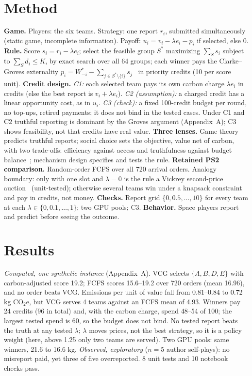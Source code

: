 \section{Method}\label{sec:method}
\textbf{Game.} Players: the six teams. Strategy: one report $r_i$, submitted simultaneously (static game, incomplete information). Payoff: $u_i=v_i-\lambda e_i-p_i$ if selected, else 0.
\textbf{Rule.} Score $s_i=r_i-\lambda e_i$; select the feasible group $S^*$ maximizing $\sum_{S}s_i$ subject to $\sum_{S}d_i\le K$, by exact search over all 64 groups; each winner pays the Clarke--Groves externality $p_i=W^*_{-i}-\sum_{j\in S^*\setminus\{i\}}s_j$~\cite{clarke1971,groves1973} in priority credits (10 per score unit).
\textbf{Credit design.} \emph{C1:} each selected team pays its own carbon charge \ensuremath{\lambda e_i} in credits (else the best report is \ensuremath{v_i+\lambda e_i}). \emph{C2 (assumption):} a charged credit has a linear opportunity cost, as in $u_i$. \emph{C3 (check):} a fixed 100-credit budget per round, no top-ups, retired payments; it does not bind in the tested cases. Under C1 and C2 truthful reporting is dominant by the Groves argument (Appendix~A); C3 shows feasibility, not that credits have real value.
\textbf{Three lenses.} Game theory predicts truthful reports; social choice sets the objective, value net of carbon, with two trade-offs: efficiency against access and truthfulness against budget balance~\cite{greenlaffont1977}; mechanism design specifies and tests the rule.
\textbf{Retained PS2 comparison.} Random-order FCFS over all 720 arrival orders. Analogy boundary: only with one slot and $\lambda=0$ is the rule a Vickrey second-price auction~\cite{vickrey1961} (unit-tested); otherwise several teams win under a knapsack constraint and pay in credits, not money.
\textbf{Checks.} Report grid $\{0,0.5,\dots,10\}$ for every team at each $\lambda\in\{0,0.1,\dots,1\}$; two GPU pools; C3. \textbf{Behavior.} Space players report and predict before seeing the outcome.

\section{Results}\label{sec:results}
\emph{Computed, one synthetic instance} (Appendix~A). VCG selects $\{A,B,D,E\}$ with carbon-adjusted score 19.2; FCFS scores 15.6--19.2 over 720 orders (mean 16.96), and no order beats VCG. Emissions per unit of value fall from 0.81--0.84 to 0.72 kg CO$_2$e, but VCG serves 4 teams against an FCFS mean of 4.93. Winners pay 24 credits (96 in total) and, with the carbon charge, spend 48--54 of 100; the largest tested spend is 60, so the budget does not bind. No tested report beats the truth at any tested $\lambda$; $\lambda$ moves prices, not the best strategy, so it is a policy weight (here, above 1.25 only two teams are served). Two GPU pools: same winners, 21.6 to 16.6 kg. \emph{Observed, exploratory} ($n=5$ author self-plays): no misreport paid, yet three of five overreported. 8 unit tests and 10 notebook checks pass.

